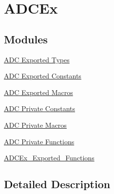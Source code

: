\hypertarget{group___a_d_c_ex}{}\section{A\+D\+C\+Ex}
\label{group___a_d_c_ex}
\subsection*{Modules}
\begin{DoxyCompactItemize}
\item 
\hyperlink{group___a_d_c_ex___exported___types}{A\+D\+C Exported Types}
\item 
\hyperlink{group___a_d_c_ex___exported___constants}{A\+D\+C Exported Constants}
\item 
\hyperlink{group___a_d_c___exported___macros}{A\+D\+C Exported Macros}
\item 
\hyperlink{group___a_d_c_ex___private___constants}{A\+D\+C Private Constants}
\item 
\hyperlink{group___a_d_c_ex___private___macros}{A\+D\+C Private Macros}
\item 
\hyperlink{group___a_d_c_ex___private___functions}{A\+D\+C Private Functions}
\item 
\hyperlink{group___a_d_c_ex___exported___functions}{A\+D\+C\+Ex\+\_\+\+Exported\+\_\+\+Functions}
\end{DoxyCompactItemize}


\subsection{Detailed Description}
